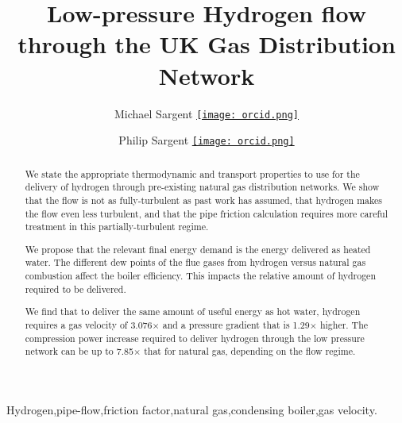 \documentclass[5p]{elsarticle} %
\newcommand{\orcid}[1]{\href{https://orcid.org/#1}{\texttt{[image: orcid.png]}}}
\begin{document}
\begin{frontmatter}



\title{Low-pressure Hydrogen flow through the UK Gas Distribution Network}

\author[mjs]{Michael Sargent \orcid{0000-0001-9129-2990} }

\author[mjs]{Philip Sargent \orcid{0000-0002-1825-0097}}

\address[mjs]{Cambridge Energy UK, 27 Greville Road, Cambridge CB1 3QJ, UK }

\begin{abstract}

We state the appropriate thermodynamic and transport properties to use for the delivery of hydrogen through pre-existing natural gas distribution networks. 
We show that the flow is not as fully-turbulent as past work has assumed, that hydrogen makes the flow even less turbulent, and that the pipe friction calculation requires more careful treatment in this partially-turbulent regime.

We propose that the relevant final energy demand is the energy delivered as heated water. 
The different dew points of the flue gases from hydrogen versus natural gas combustion affect the boiler efficiency. This impacts the relative amount of hydrogen required to be delivered.

We find that to deliver the same amount of useful energy as hot water, hydrogen requires a gas velocity of 3.076$\times$ and a pressure gradient that is 1.29$\times$ higher.
The compression power increase required to deliver hydrogen through the low pressure network can be up to 7.85$\times$ that for natural gas, depending on the flow regime.

\end{abstract}

\begin{keyword}
Hydrogen\sep pipe-flow\sep friction factor\sep natural gas\sep condensing boiler\sep gas velocity.
\end{keyword}

\end{frontmatter}
\end{document}

